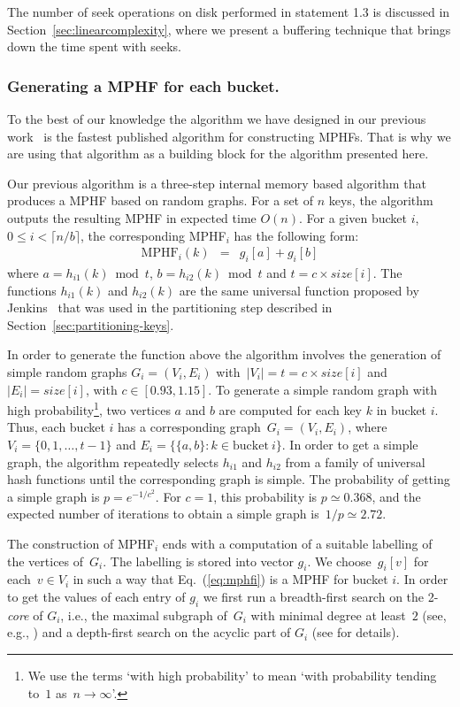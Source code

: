 The number of seek operations on disk performed in statement 1.3 is discussed
in Section~\ref{sec:linearcomplexity}, 
where we present a buffering technique that brings down 
the time spent with seeks.

\vspace{-2mm}
\enlargethispage{2\baselineskip}
\subsubsection{Generating a MPHF for each bucket.} \label{sec:mphfbucket}

To the best of our knowledge the algorithm we have designed in
our previous work~\cite{bkz05} is the fastest published algorithm for
constructing MPHFs.
That is why we are using that algorithm as a building block for the 
algorithm presented here.

Our previous algorithm is a three-step internal memory based algorithm
that produces a MPHF based on random graphs.
For a set of $n$ keys, the algorithm outputs the resulting MPHF in expected time $O(n)$.
For a given bucket $i$, $0 \leq i < \lceil n/b \rceil$, the corresponding MPHF$_i$ 
has the following form:
\begin{eqnarray}
        \mathrm{MPHF}_i(k) &=& g_i[a] + g_i[b] \label{eq:mphfi}
\end{eqnarray} 
where $a = h_{i1}(k) \bmod t$, $b = h_{i2}(k) \bmod t$ and
$t = c\times \mathit{size}[i]$. The functions
$h_{i1}(k)$ and $h_{i2}(k)$ are the same universal function proposed by Jenkins~\cite{j97}
that was used in the partitioning step described in Section~\ref{sec:partitioning-keys}.

In order to generate the function above the algorithm involves the generation of simple random graphs
$G_i = (V_i, E_i)$ with~$|V_i|=t=c\times\mathit{size}[i]$ and $|E_i|=\mathit{size}[i]$, with  $c \in [0.93, 1.15]$.
To generate a simple random graph with high 
probability\footnote{We use the terms `with high probability'
to mean `with probability tending to~$1$ as~$n\to\infty$'.}, two vertices $a$ and $b$ are
computed for each key $k$ in bucket $i$.
Thus, each bucket $i$ has a corresponding graph~$G_i=(V_i,E_i)$, where $V_i=\{0,1,
\ldots,t-1\}$ and $E_i=\big\{\{a,b\}:k \in \mathrm{bucket}\: i\big\}$.
In order to get a simple graph, 
the algorithm repeatedly selects $h_{i1}$ and $h_{i2}$ from a family of universal hash functions
until the corresponding graph is simple.
The probability of getting a simple graph is $p=e^{-1/c^2}$.
For $c=1$, this probability is $p \simeq 0.368$, and the expected number of 
iterations to obtain a simple graph is~$1/p \simeq 2.72$.

The construction of MPHF$_i$ ends with a computation of a suitable labelling of the vertices
of~$G_i$. The labelling is stored into vector $g_i$.
We choose~$g_i[v]$ for each~$v\in V_i$ in such
a way that Eq.~(\ref{eq:mphfi}) is a MPHF for bucket $i$.
In order to get the values of each entry of $g_i$ we first 
run a breadth-first search on the 2-\textit{core} of $G_i$, i.e., the maximal subgraph 
of~$G_i$ with minimal degree at least~$2$ (see, e.g., \cite{b01,jlr00,pw04}) and
a depth-first search on the acyclic part of $G_i$ (see \cite{bkz05} for details).

